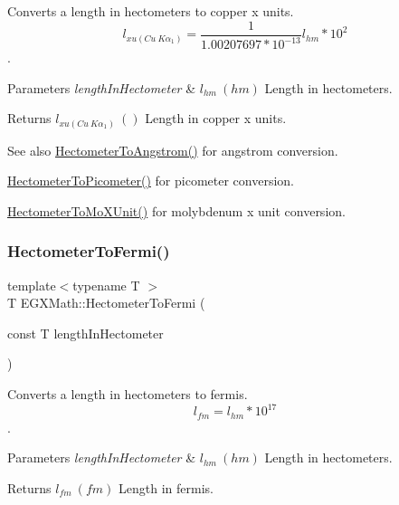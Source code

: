 Converts a length in hectometers to copper x units. \[ l_{xu(Cu\ K\alpha_1)}= \frac{1}{1.00207697*10^{-13}} l_{hm} * 10^{2}\]. 


\begin{DoxyParams}{Parameters}
{\em length\+In\+Hectometer} & $ l_{hm}\ (hm)$ Length in hectometers. \\
\hline
\end{DoxyParams}
\begin{DoxyReturn}{Returns}
$ l_{xu(Cu\ K\alpha_1)}\ ()$ Length in copper x units. 
\end{DoxyReturn}
\begin{DoxySeeAlso}{See also}
\mbox{\hyperlink{group___e_g_x_math-_conversions-_length_conversions-_hectometer-_non-_s_i_gad1296c0169aa8a99802a30b65a2ea516}{Hectometer\+To\+Angstrom()}} for angstrom conversion. 

\mbox{\hyperlink{group___e_g_x_math-_conversions-_length_conversions-_hectometer-_s_i_gaa45a09cd750ee4e48680332f0ce39f07}{Hectometer\+To\+Picometer()}} for picometer conversion. 

\mbox{\hyperlink{group___e_g_x_math-_conversions-_length_conversions-_hectometer-_non-_s_i_gac2840604040746ae9a4c51fd1bb3e6f6}{Hectometer\+To\+Mo\+X\+Unit()}} for molybdenum x unit conversion. 
\end{DoxySeeAlso}
\mbox{\label{group___e_g_x_math-_conversions-_length_conversions-_hectometer-_non-_s_i_gabd26977f3d5ad9d0560afb10be63a598}} 
\subsubsection{\texorpdfstring{Hectometer\+To\+Fermi()}{HectometerToFermi()}}
{\footnotesize\ttfamily template$<$typename T $>$ \\
T E\+G\+X\+Math\+::\+Hectometer\+To\+Fermi (\begin{DoxyParamCaption}\item[{const T}]{length\+In\+Hectometer }\end{DoxyParamCaption})}



Converts a length in hectometers to fermis. \[ l_{fm}=l_{hm} * 10^{17} \]. 


\begin{DoxyParams}{Parameters}
{\em length\+In\+Hectometer} & $ l_{hm}\ (hm)$ Length in hectometers. \\
\hline
\end{DoxyParams}
\begin{DoxyReturn}{Returns}
$ l_{fm}\ (fm)$ Length in fermis. 
\end{DoxyReturn}
\mbox{\label{group___e_g_x_math-_conversions-_length_conversions-_hectometer-_non-_s_i_ga997feaaeb91fc61c1d87c5d77fb7a665}} 
